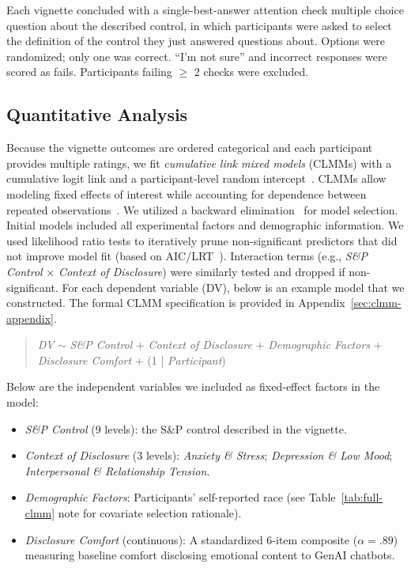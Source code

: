 \documentclass[letterpaper,twocolumn,10pt]{article}
\begin{document}
 Each vignette concluded with a single-best-answer attention check multiple choice question about the described control, in which participants were asked to select the definition of the control they just answered questions about. Options were randomized; only one was correct. ``I'm not sure'' and incorrect responses were scored as fails. Participants failing $\geq$ 2 checks were excluded.

\subsection{Quantitative Analysis}
Because the vignette outcomes are ordered categorical and each participant provides multiple ratings, we fit \emph{cumulative link mixed models} (CLMMs) with a cumulative logit link and a participant-level random intercept~\cite{christensen2025ordinal}. CLMMs allow modeling fixed effects of interest while accounting for dependence between repeated observations~\cite{taylor2023rating}. We utilized a backward elimination~\cite{harrell2015rms} for model selection. Initial models included all experimental factors and demographic information. We used likelihood ratio tests to iteratively prune non-significant predictors that did not improve model fit (based on AIC/LRT~\cite{burnham2002model}). Interaction terms (e.g., \textit{S\&P Control} $\times$ \textit{Context of Disclosure}) were similarly tested and dropped if non-significant. For each dependent variable (DV), below is an example model that we constructed. The formal CLMM specification is provided in Appendix~\ref{sec:clmm-appendix}.

\begin{quote}
\textit{DV} $\sim$ \textit{S\&P Control} + \textit{Context of Disclosure} + \textit{Demographic Factors} + \textit{Disclosure Comfort} + (1 | \textit{Participant})
\end{quote}

Below are the independent variables we included as fixed-effect factors in the model:

\begin{itemize}
\item \textit{S\&P Control} (9 levels): the S\&P control described in the vignette.
\item \textit{Context of Disclosure} (3 levels): \emph{Anxiety \& Stress}; \emph{Depression \& Low Mood}; \emph{Interpersonal \& Relationship Tension}. 
\item \textit{Demographic Factors}: Participants' self-reported race (see Table~\ref{tab:full-clmm} note for covariate selection rationale). 
\item \textit{Disclosure Comfort} (continuous): A standardized 6-item composite ($\alpha = .89$) measuring baseline comfort disclosing emotional content to GenAI chatbots.
\end{itemize}
\end{document}
